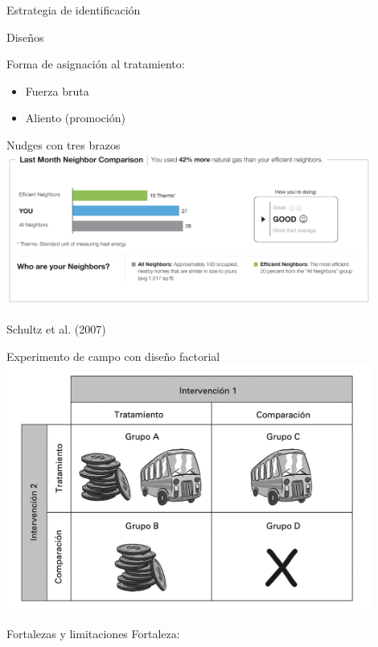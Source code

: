 \documentclass[
  ignorenonframetext,
]{beamer}
\providecommand{\tightlist}{%
  \setlength{\itemsep}{0pt}\setlength{\parskip}{0pt}}
\begin{document}
\begin{frame}{Estrategia de identificación}
\begin{frame}{Diseños}
\pause

Forma de asignación al tratamiento:

\begin{itemize}
\tightlist
\item
  Fuerza bruta\pause
\item
  Aliento (promoción)
\end{itemize}
\end{frame}

\begin{frame}{Nudges con tres brazos}
\protect\hypertarget{nudges-con-tres-brazos}{}
\includegraphics[width=0.9\textwidth,height=\textheight]{figs/electricity_nudge}

\begin{scriptsize}
Schultz et al. (2007) 
\end{scriptsize}
\end{frame}

\begin{frame}{Experimento de campo con diseño factorial}
\protect\hypertarget{experimento-de-campo-con-diseuxf1o-factorial}{}
\includegraphics[width=0.9\textwidth,height=\textheight]{figs/dos_int2}
\end{frame}

\begin{frame}{Fortalezas y limitaciones}
\protect\hypertarget{fortalezas-y-limitaciones}{}
Fortaleza:


\end{frame}
\end{frame}
\end{document}
